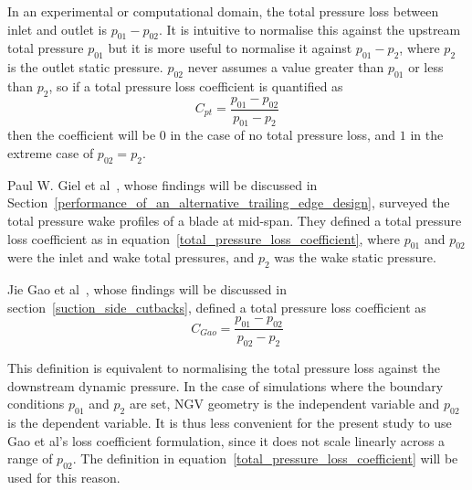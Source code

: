 \documentclass[a4paper, 11pt, oneside]{report}
\begin{document}
In an experimental or computational domain, the total pressure loss between inlet and outlet is $p_{01} - p_{02}$. It is intuitive to normalise this against the upstream total pressure $p_{01}$ but it is more useful to normalise it against $p_{01} - p_2$, where $p_2$ is the outlet static pressure. $p_{02}$ never assumes a value greater than $p_{01}$ or less than $p_2$, so if a total pressure loss coefficient is quantified as
\begin{equation}\label{total_pressure_loss_coefficient}
C_{pt} = \frac{
p_{01} - p_{02}
}{
p_{01} - p_2
}
\end{equation}
then the coefficient will be $0$ in the case of no total pressure loss, and $1$ in the extreme case of $p_{02} = p_2$.

Paul W. Giel et al~\cite{giel_te_thickness}, whose findings will be discussed in Section~\ref{performance_of_an_alternative_trailing_edge_design}, surveyed the total pressure wake profiles of a blade at mid-span. They defined a total pressure loss coefficient as in equation~\ref{total_pressure_loss_coefficient}, where $p_{01}$ and $p_{02}$ were the inlet and wake total pressures, and $p_2$ was the wake static pressure. 

Jie Gao et al~\cite{gao_te}, whose findings will be discussed in section~\ref{suction_side_cutbacks}, defined a total pressure loss coefficient as
\begin{equation}
C_{Gao} = \frac{
p_{01} - p_{02}
}{
p_{02} - p_2
}
\end{equation}

This definition is equivalent to normalising the total pressure loss against the downstream dynamic pressure. In the case of simulations where the boundary conditions $p_{01}$ and $p_2$ are set, NGV geometry is the independent variable and $p_{02}$ is the dependent variable. It is thus less convenient for the present study to use Gao et al's loss coefficient formulation, since it does not scale linearly across a range of $p_{02}$. The definition in equation~\ref{total_pressure_loss_coefficient} will be used for this reason.
\end{document}
